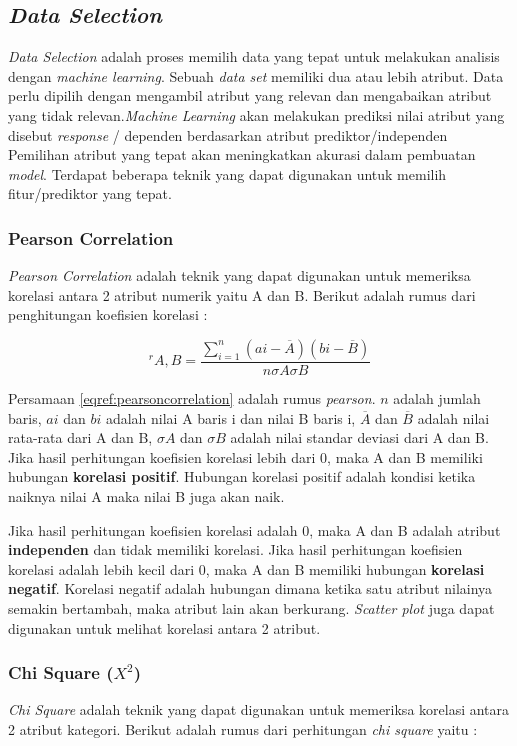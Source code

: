 \subsection{\textit{Data Selection}}
\textit{Data Selection} adalah proses memilih data yang tepat untuk melakukan analisis dengan \textit{machine learning}. Sebuah \textit{data set} memiliki dua atau lebih atribut. Data perlu dipilih dengan mengambil atribut yang relevan dan mengabaikan atribut yang tidak relevan.\textit{Machine Learning} akan melakukan prediksi nilai atribut yang disebut \textit{response} / dependen berdasarkan atribut prediktor/independen Pemilihan atribut yang tepat akan meningkatkan akurasi dalam pembuatan \textit{model}. Terdapat beberapa teknik yang dapat digunakan untuk memilih fitur/prediktor yang tepat.

\subsubsection{Pearson Correlation}
\textit{Pearson Correlation} adalah teknik yang dapat digunakan untuk memeriksa korelasi antara 2 atribut numerik yaitu A dan B. Berikut adalah rumus dari penghitungan koefisien korelasi : 

\begin{equation}
^r A,B = \frac{\sum_{i=1}^{n}(ai - \overline{A})(bi - \overline{B})}{n\sigma A \sigma B}
\label{eqref:pearsoncorrelation}
\end{equation}

Persamaan \ref{eqref:pearsoncorrelation} adalah rumus \textit{pearson}. $n$ adalah jumlah baris, $ai$ dan $bi$ adalah nilai A baris i dan nilai B baris i, $ \overline{A} $  dan $\overline{B}$ adalah nilai rata-rata dari A dan B, $\sigma A$ dan $\sigma B$ adalah nilai standar deviasi dari A dan B. Jika hasil perhitungan koefisien korelasi lebih dari 0, maka A dan B memiliki hubungan \textbf{korelasi positif}. Hubungan korelasi positif adalah kondisi ketika naiknya nilai A maka nilai B juga akan naik. 

Jika hasil perhitungan koefisien korelasi adalah 0, maka A dan B adalah atribut \textbf{independen} dan tidak memiliki korelasi. Jika hasil perhitungan koefisien korelasi adalah lebih kecil dari 0, maka A dan B memiliki hubungan \textbf{korelasi negatif}. Korelasi negatif adalah hubungan dimana ketika satu atribut nilainya semakin bertambah, maka atribut lain akan berkurang. \textit{Scatter plot} juga dapat digunakan untuk melihat korelasi antara 2 atribut.  


\subsubsection{Chi Square ($X^2 $)}
\textit{Chi Square} adalah teknik yang dapat digunakan untuk memeriksa korelasi antara 2 atribut kategori. Berikut adalah rumus dari perhitungan \textit{chi square} yaitu : 

